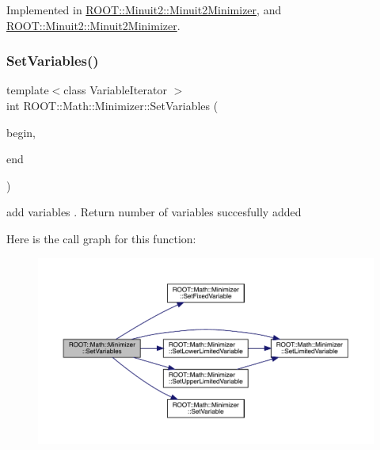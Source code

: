 Implemented in \mbox{\hyperlink{classROOT_1_1Minuit2_1_1Minuit2Minimizer_a951ad856f74ded3c64836fa28fdf9bb5}{R\+O\+O\+T\+::\+Minuit2\+::\+Minuit2\+Minimizer}}, and \mbox{\hyperlink{classROOT_1_1Minuit2_1_1Minuit2Minimizer_a951ad856f74ded3c64836fa28fdf9bb5}{R\+O\+O\+T\+::\+Minuit2\+::\+Minuit2\+Minimizer}}.

\mbox{\label{classROOT_1_1Math_1_1Minimizer_a314040274ee907fba52726275a28c9f7}} 
\subsubsection{\texorpdfstring{SetVariables()}{SetVariables()}\hspace{0.1cm}{\footnotesize\ttfamily [1/2]}}
{\footnotesize\ttfamily template$<$class Variable\+Iterator $>$ \\
int R\+O\+O\+T\+::\+Math\+::\+Minimizer\+::\+Set\+Variables (\begin{DoxyParamCaption}\item[{const Variable\+Iterator \&}]{begin,  }\item[{const Variable\+Iterator \&}]{end }\end{DoxyParamCaption})\hspace{0.3cm}{\ttfamily [inline]}}



add variables . Return number of variables succesfully added 

Here is the call graph for this function\+:
\nopagebreak
\begin{figure}[H]
\begin{center}
\leavevmode
\includegraphics[width=350pt]{dc/dc4/classROOT_1_1Math_1_1Minimizer_a314040274ee907fba52726275a28c9f7_cgraph}
\end{center}
\end{figure}
\mbox{\label{classROOT_1_1Math_1_1Minimizer_a314040274ee907fba52726275a28c9f7}} 
